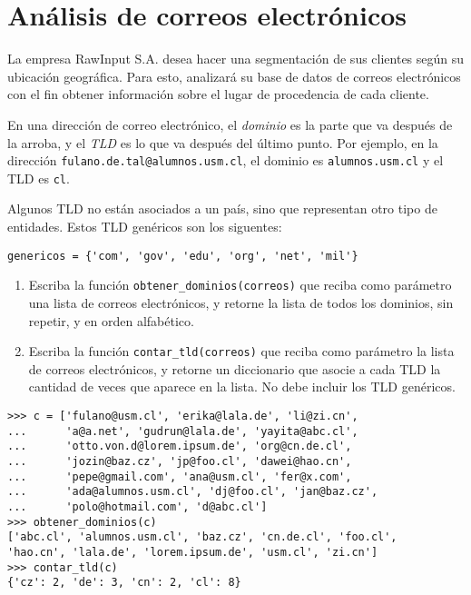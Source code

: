 \section{Análisis de correos electrónicos}

La empresa RawInput S.A. desea hacer una segmentación de sus clientes
según su ubicación geográfica. Para esto, analizará su base de datos de
correos electrónicos con el fin obtener información sobre el lugar de
procedencia de cada cliente.

En una dirección de correo electrónico, el \emph{dominio} es la parte
que va después de la arroba, y el \emph{TLD} es lo que va después del
último punto. Por ejemplo, en la dirección
\lstinline!fulano.de.tal@alumnos.usm.cl!, el dominio es
\lstinline!alumnos.usm.cl! y el TLD es \lstinline!cl!.

Algunos TLD no están asociados a un país, sino que representan otro tipo
de entidades. Estos TLD genéricos son los siguentes:
\begin{lstlisting}
genericos = {'com', 'gov', 'edu', 'org', 'net', 'mil'}
\end{lstlisting}

\begin{enumerate}
\item
  Escriba la función \lstinline!obtener_dominios(correos)! que reciba
  como parámetro una lista de correos electrónicos, y retorne la lista
  de todos los dominios, sin repetir, y en orden alfabético.
\item
  Escriba la función \lstinline!contar_tld(correos)! que reciba como
  parámetro la lista de correos electrónicos, y retorne un diccionario
  que asocie a cada TLD la cantidad de veces que aparece en la lista. No
  debe incluir los TLD genéricos.
\end{enumerate}

\begin{lstlisting}
>>> c = ['fulano@usm.cl', 'erika@lala.de', 'li@zi.cn',
...      'a@a.net', 'gudrun@lala.de', 'yayita@abc.cl',
...      'otto.von.d@lorem.ipsum.de', 'org@cn.de.cl',
...      'jozin@baz.cz', 'jp@foo.cl', 'dawei@hao.cn',
...      'pepe@gmail.com', 'ana@usm.cl', 'fer@x.com',
...      'ada@alumnos.usm.cl', 'dj@foo.cl', 'jan@baz.cz',
...      'polo@hotmail.com', 'd@abc.cl']
>>> obtener_dominios(c)
['abc.cl', 'alumnos.usm.cl', 'baz.cz', 'cn.de.cl', 'foo.cl',
'hao.cn', 'lala.de', 'lorem.ipsum.de', 'usm.cl', 'zi.cn']
>>> contar_tld(c)
{'cz': 2, 'de': 3, 'cn': 2, 'cl': 8}
\end{lstlisting}

